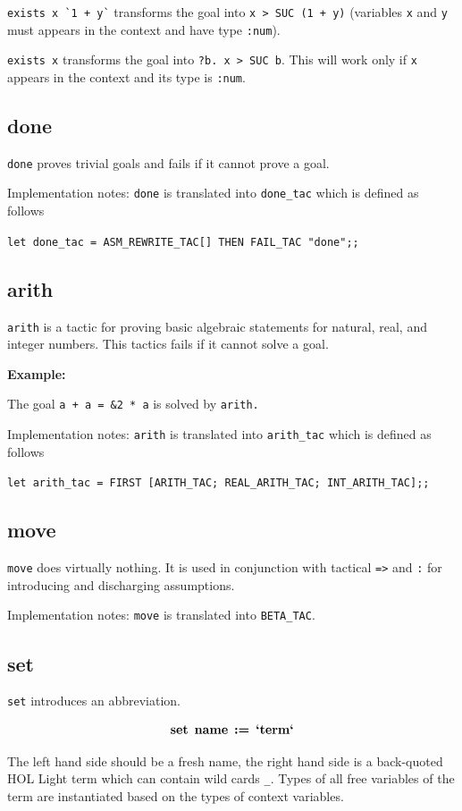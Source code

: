 \documentclass[a4paper]{article}
\newcommand{\xx}[1]{\mathop{\text{\bf #1}}}
\begin{document}
\verb|exists x `1 + y`| transforms the goal into \verb|x > SUC (1 + y)| (variables \verb|x| and \verb|y| must appears in the context and have type \verb|:num|).

\verb|exists x| transforms the goal into \verb|?b. x > SUC b|. This will work only if \verb|x| appears in the context and its type is \verb|:num|.


\subsection{done}
\verb|done| proves trivial goals and fails if it cannot prove a goal.

Implementation notes: \verb|done| is translated into \verb|done_tac| which is defined as follows

\verb|let done_tac = ASM_REWRITE_TAC[] THEN FAIL_TAC "done";;|


\subsection{arith}
\verb|arith| is a tactic for proving basic algebraic statements for natural, real, and integer numbers. This tactics fails if it cannot solve a goal.

{\bf Example:}

The goal \verb|a + a = &2 * a| is solved by \verb|arith.|

Implementation notes: \verb|arith| is translated into \verb|arith_tac| which is defined as follows

\verb|let arith_tac = FIRST [ARITH_TAC; REAL_ARITH_TAC; INT_ARITH_TAC];;|


\subsection{move}
\verb|move| does virtually nothing. It is used in conjunction with tactical \verb|=>| and \verb|:| for introducing and discharging assumptions.

Implementation notes: \verb|move| is translated into \verb|BETA_TAC|.


\subsection{set}
\verb|set| introduces an abbreviation.

$$\xx{set}\ \xx{name}\ \xx{:=}\ \xx{`term`}$$

The left hand side should be a fresh name, the right hand side is a back-quoted HOL Light term which can contain wild cards \verb|_|. Types of all free variables of the term are instantiated based on the types of context variables.
\end{document}
